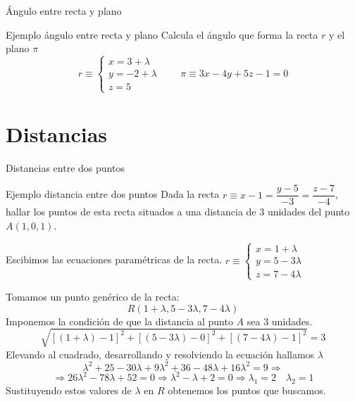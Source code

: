\documentclass[8pt,handout]{beamer}
\renewcommand{\vector}[1]{\overrightarrow{#1}}
\newcommand{\g}{{}^\circ}
\newcommand{\arcsen}{\mathop{\rm arcsen}\nolimits}
\begin{document}
\begin{frame}{Ángulo entre recta y plano}
\begin{exampleblock}{Ejemplo ángulo entre recta y plano}
Calcula el ángulo que forma la recta $r$ y el plano $\pi$
\[ r \equiv \begin{cases} x= 3+\lambda \\ y = -2+\lambda \\ z= 5 \end{cases} \qquad \pi \equiv 3x-4y+5z-1=0 \] 
\end{exampleblock}
\onslide*<3->{
\[ \vector{v}=(1,1,0) \qquad \vector{n}=(3,-4,5) \]
}
\onslide*<5->{
\[ \alpha = \arcsen \left( \dfrac{|1\cdot 3 +1 \cdot (-4) +0 \cdot 5|}{\sqrt{1^2+1^2+0^2}\sqrt{3^2+(-4)^2+5^2}} \right)= \arcsen \left(\dfrac{1}{\sqrt{2}\sqrt{50}}\right) \Rightarrow \]
}
\onslide*<6->{ \resultado{ $\alpha =  5,74\g$}}

\end{frame}

\section{Distancias}

\begin{frame}{Distancias entre dos puntos}
\begin{exampleblock}{Ejemplo distancia entre dos puntos}
Dada la recta $r \equiv x-1=\dfrac{y-5}{-3}=\dfrac{z-7}{-4}$, hallar los puntos de esta recta situados a una distancia de 3 unidades del punto $A(1,0,1)$.
\end{exampleblock}
\pause

Escibimos las ecuaciones paramétricas de la recta.
\pause
$r \equiv \begin{cases} x=1+\lambda \\ y = 5-3\lambda \\ z= 7-4\lambda \end{cases}$
\pause

Tomamos un punto genérico de la recta:
\pause
\[ R (1+\lambda, 5-3\lambda, 7-4\lambda) \]
\pause
Imponemos la condición de que la distancia al punto $A$ sea 3 unidades.
\pause
\[ \sqrt{[(1+\lambda)-1]^2+[( 5-3\lambda)-0]^2+[(7-4\lambda)-1]^2}=3 \]
\pause
Elevando al cuadrado, desarrollando y resolviendo la ecuación hallamos $\lambda$
\pause
\[ \lambda^2+25-30\lambda+9\lambda^2+36-48\lambda+16\lambda^2=9 \Rightarrow \]
\[ \Rightarrow 26\lambda^2-78\lambda+52=0 \Rightarrow \lambda^2-\lambda+2=0 \Rightarrow \lambda_1 = 2 \quad \lambda_2= 1 \]
\pause
Sustituyendo estos valores de $\lambda$ en $R$ obtenemos los puntos que buscamos. 
\end{frame}
\end{document}
